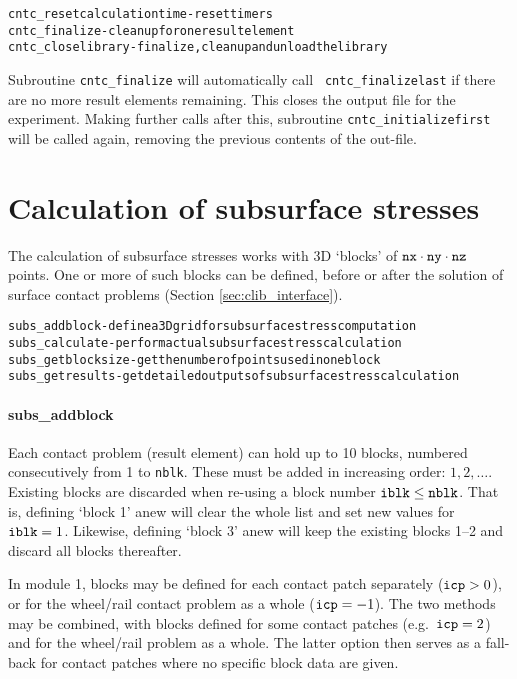\documentclass[12pt]{report}
\begin{document}
\begin{alltt}\small
cntc_resetcalculationtime  - reset timers
cntc_finalize              - cleanup for one result element
cntc_closelibrary          - finalize, cleanup and unload the library
\end{alltt}
Subroutine {\tt cntc\_finalize} will automatically call {\tt
cntc\_finalizelast} if there are no more result elements remaining. This
closes the output file for the experiment. Making further calls after this,
subroutine {\tt cntc\_initializefirst} will be called again, removing the
previous contents of the out-file.

\section{Calculation of subsurface stresses}
\label{sec:clib_subs}

The calculation of subsurface stresses works with 3D `blocks' of ${\tt
nx}\cdot {\tt ny}\cdot {\tt nz}$ points. One or more of such blocks can
be defined, before or after the solution of surface contact problems
(Section \ref{sec:clib_interface}).

\begin{alltt}\small
subs_addblock      - define a 3D grid for subsurface stress computation
subs_calculate     - perform actual subsurface stress calculation
subs_getblocksize  - get the number of points used in one block
subs_getresults    - get detailed outputs of subsurface stress calculation
\end{alltt}

\paragraph{subs\_addblock}

Each contact problem (result element) can hold up to 10 blocks, numbered
consecutively from 1 to {\tt nblk}. These must be added in increasing
order: $1, 2, \ldots$. Existing blocks are discarded when re-using a
block number ${\tt iblk}\le {\tt nblk}$. That is, defining
`block 1' anew will clear the whole list and set new values for
${\tt iblk}=1$. Likewise, defining `block 3' anew will keep the
existing blocks 1--2 and discard all blocks thereafter.

In module 1, blocks may be defined for each contact patch separately (${\tt
icp}>0$), or for the wheel/rail contact problem as a whole (${\tt icp}=-1$).
The two methods may be combined, with blocks defined for some contact
patches (e.g.\ ${\tt icp}=2$) and for the wheel/rail problem as a whole.
The latter option then serves as a fall-back for contact patches
where no specific block data are given.
\end{document}
